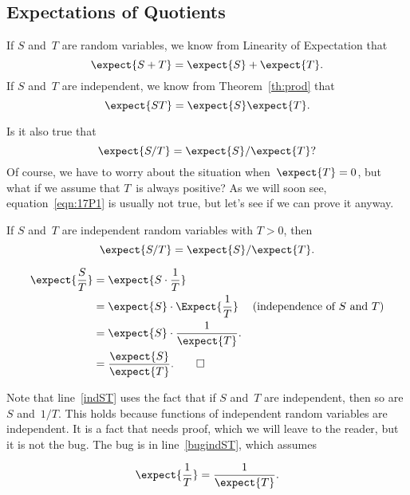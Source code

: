 \begin{editingnotes}
\section{Expectations of Quotients}

If $S$ and~$T$ are random variables, we know from Linearity of
Expectation that
\begin{equation*}
    \expect{S + T} = \expect{S} + \expect{T}.
\end{equation*}
If $S$ and~$T$ are independent, we know from Theorem~\ref{th:prod}
that
\begin{equation*}
    \expect{ST} = \expect{S} \expect{T}.
\end{equation*}

Is it also true that
\begin{equation}\label{eqn:17P1}
    \expect{S/T} = \expect{S}/\expect{T}?
\end{equation}
Of course, we have to worry about the situation when~$\expect{T} = 0$,
but what if we assume that $T$~is always positive?  As we will soon
see, equation~\eqref{eqn:17P1} is usually not true, but let's see if we
can prove it anyway.

\begin{falseclm}\label{fc:17P2}
If $S$ and~$T$ are independent random variables with $T > 0$, then
\begin{equation}
    \expect{S/T} = \expect{S}/\expect{T}.
\end{equation}
\end{falseclm}

\begin{bogusproof}
\begin{align}
\expect{\frac{S}{T}} & = \expect{S \cdot \frac{1}{T}} \notag\\
       & = \expect{S} \cdot \Expect{\frac{1}{T}} & \text{(independence of $S$
       and $T$)}\label{indST}\\
      & = \expect{S} \cdot \frac{1}{\expect{T}}. \label{bugindST}\\
      & = \frac{\expect{S}}{\expect{T}}.\notag \qedhere
\end{align}
\end{bogusproof}
Note that line~\ref{indST} uses the fact that if $S$ and~$T$ are
independent, then so are $S$ and~$1/T$.  This holds because functions
of independent random variables are independent.  It is a fact that
needs proof, which we will leave to the reader, but it is not the
bug. The bug is in line~\eqref{bugindST}, which assumes
\begin{falseclm}\label{false-inverse}
\[
\expect{\frac{1}{T}} =  \frac{1}{\expect{T}}.
\]
\end{falseclm}


\end{editingnotes}

